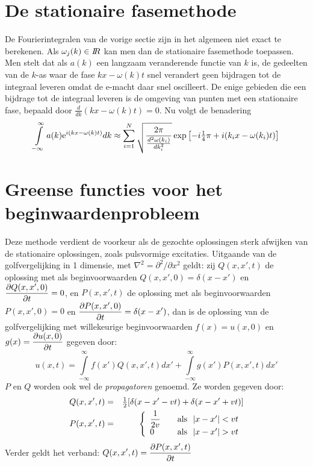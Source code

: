 \section{De stationaire fasemethode}
De Fourierintegralen van de vorige sectie zijn in het algemeen niet exact te
berekenen. Als $\omega_j(k)\in I\hspace{-1mm}R$ kan men dan de stationaire fasemethode
toepassen. Men stelt dat als $a(k)$ een langzaam veranderende functie van $k$
is, de gedeelten van de $k$-as waar de fase $kx-\omega(k)t$ snel verandert
geen bijdragen tot de integraal leveren omdat de e-macht daar snel oscilleert.
De enige gebieden die een bijdrage tot de integraal leveren is de omgeving
van punten met een stationaire fase, bepaald door
$\displaystyle\frac{d}{dk}(kx-\omega(k)t)=0$. Nu volgt de benadering
\[
\int\limits_{-\infty}^\infty a(k){\rm e}^{i(kx-\omega(k)t)}dk\approx
\sum_{i=1}^{N}\sqrt{\frac{2\pi}{\frac{d^2\omega(k_i)}{dk_i^2}}}
\exp\left[-i\mbox{$\frac{1}{4}$}\pi+i(k_ix-\omega(k_i)t)\right]
\]

\section{Greense functies voor het beginwaardenprobleem}
Deze methode verdient de voorkeur als de gezochte oplossingen sterk afwijken
van de stationaire oplossingen, zoals pulsvormige excitaties. Uitgaande van
de golfvergelijking in 1 dimensie, met $\nabla^2=\partial^2/\partial x^2$ geldt:
zij $Q(x,x',t)$ de oplossing met als beginvoorwaarden $Q(x,x',0)=\delta(x-x')$
en $\displaystyle\frac{\partial Q(x,x',0)}{\partial t}=0$, en $P(x,x',t)$ de oplossing met als
beginvoorwaarden $P(x,x',0)=0$ en $\displaystyle\frac{\partial P(x,x',0)}{\partial t}=\delta(x-x')$,
dan is de oplossing van de golfvergelijking met willekeurige beginvoorwaarden
$f(x)=u(x,0)$ en $\displaystyle g(x)=\frac{\partial u(x,0)}{\partial t}$ gegeven door:
\[
u(x,t)=\int\limits_{-\infty}^\infty f(x')Q(x,x',t)dx'+
\int\limits_{-\infty}^\infty g(x')P(x,x',t)dx'
\]
$P$ en $Q$ worden ook wel de {\it propagatoren} genoemd. Ze worden gegeven
door:
\begin{eqnarray*}
Q(x,x',t)&=&\half[\delta(x-x'-vt)+\delta(x-x'+vt)]\\
P(x,x',t)&=&
\left\{\begin{array}{ll}
\displaystyle\frac{1}{2v}&~~~\mbox{als}~~|x-x'|<vt\\
0&~~~\mbox{als}~~|x-x'|>vt
\end{array}\right.
\end{eqnarray*}
Verder geldt het verband: $\displaystyle Q(x,x',t)=\frac{\partial P(x,x',t)}{\partial t}$


